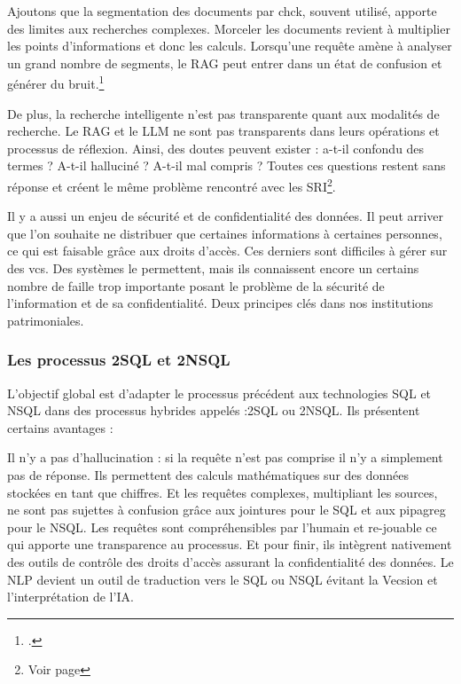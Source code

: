 Ajoutons que la segmentation des documents par \gls{chck}, souvent utilisé, apporte des limites aux recherches complexes. Morceler les documents revient à multiplier les points d'informations et donc les calculs. Lorsqu'une requête amène à analyser un grand nombre de segments, le \gls{RAG} peut entrer dans un état de confusion et générer du bruit.\footcite{cazzaroQueryingLLMsIf} 

De plus, la recherche intelligente n'est pas transparente quant aux modalités de recherche. Le \gls{RAG} et le \gls{LLM} ne sont pas transparents dans leurs opérations et processus de réflexion. Ainsi, des doutes peuvent exister : a-t-il confondu des termes ? A-t-il halluciné ? A-t-il mal compris ? Toutes ces questions restent sans réponse et créent le même problème rencontré avec les \gls{SRI}\footnote{Voir page \pageref{opaque}}. 

Il y a aussi un enjeu de sécurité et de confidentialité des données. Il peut arriver que l'on souhaite ne distribuer que certaines informations à certaines personnes, ce qui est faisable grâce aux droits d'accès. Ces derniers sont difficiles à gérer sur des \gls{vcs}. Des systèmes le permettent, mais ils connaissent encore un certains nombre de faille trop importante posant le problème de la sécurité de l'information et de sa confidentialité. Deux principes clés dans nos institutions patrimoniales.

\subsubsection{Les processus \gls{2SQL} et \gls{2NSQL}}

L'objectif global est d'adapter le processus précédent aux technologies SQL et \gls{NSQL} dans des processus hybrides appelés :\gls{2SQL} ou \gls{2NSQL}. Ils présentent certains avantages :

Il n'y a pas d'hallucination : si la requête n'est pas comprise il n'y a simplement pas de réponse. Ils permettent des calculs mathématiques sur des données stockées en tant que chiffres. Et les requêtes complexes, multipliant les sources, ne sont pas sujettes à confusion grâce aux jointures pour le SQL et aux \gls{pipagreg} pour le \gls{NSQL}. Les requêtes sont compréhensibles par l'humain et re-jouable ce qui apporte une transparence au processus. Et pour finir, ils intègrent nativement des outils de contrôle des droits d'accès assurant la confidentialité des données. Le \gls{NLP} devient un outil de traduction vers le SQL ou \gls{NSQL} évitant la \gls{Vecsion} et l'interprétation de l'\gls{IA}. 

